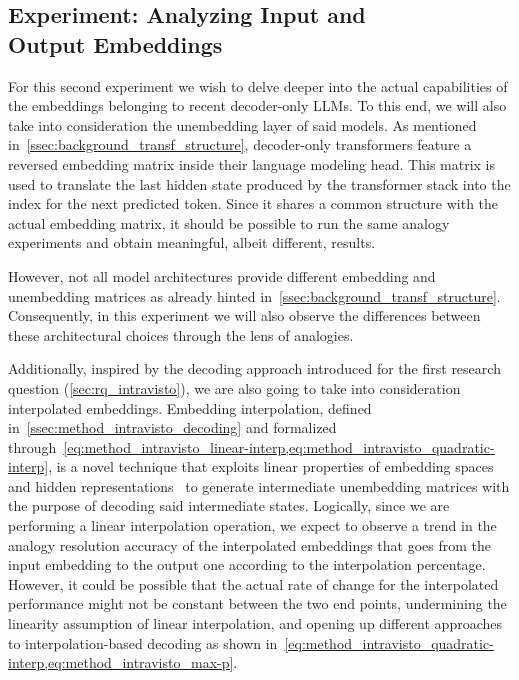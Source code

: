 \subsection{Experiment: Analyzing Input and \texorpdfstring{ \\ }{} Output Embeddings}\label{ssec:exp_emb_exp2}

For this second experiment we wish to delve deeper into the actual capabilities of the embeddings belonging to recent decoder-only LLMs.
To this end, we will also take into consideration the unembedding layer of said models.
As mentioned in~\cref{ssec:background_transf_structure}, decoder-only transformers feature a reversed embedding matrix inside their language modeling head.
This matrix is used to translate the last hidden state produced by the transformer stack into the index for the next predicted token.
Since it shares a common structure with the actual embedding matrix, it should be possible to run the same analogy experiments and obtain meaningful, albeit different, results.

However, not all model architectures provide different embedding and unembedding matrices as already hinted in~\cref{ssec:background_transf_structure}.
Consequently, in this experiment we will also observe the differences between these architectural choices through the lens of analogies.

Additionally, inspired by the decoding approach introduced for the first research question (\cref{sec:rq_intravisto}), we are also going to take into consideration interpolated embeddings.
Embedding interpolation, defined in~\cref{ssec:method_intravisto_decoding} and formalized through~\cref{eq:method_intravisto_linear-interp,eq:method_intravisto_quadratic-interp}, is a novel technique that exploits linear properties of embedding spaces and hidden representations~\cite{park2023, mikolov2013, drozd2016} to generate intermediate unembedding matrices with the purpose of decoding said intermediate states.
Logically, since we are performing a linear interpolation operation, we expect to observe a trend in the analogy resolution accuracy of the interpolated embeddings that goes from the input embedding to the output one according to the interpolation percentage.
However, it could be possible that the actual rate of change for the interpolated performance might not be constant between the two end points, undermining the linearity assumption of linear interpolation, and opening up different approaches to interpolation-based decoding as shown in~\cref{eq:method_intravisto_quadratic-interp,eq:method_intravisto_max-p}.

